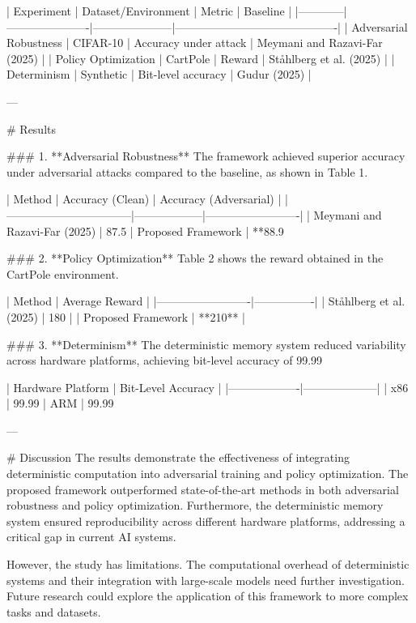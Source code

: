 | Experiment | Dataset/Environment | Metric              | Baseline                                  |
|------------|----------------------|---------------------|-------------------------------------------|
| Adversarial Robustness | CIFAR-10              | Accuracy under attack | Meymani and Razavi-Far (2025)            |
| Policy Optimization | CartPole              | Reward              | Ståhlberg et al. (2025)                   |
| Determinism          | Synthetic             | Bit-level accuracy  | Gudur (2025)                              |

---

# Results  

### 1. **Adversarial Robustness**  
The framework achieved superior accuracy under adversarial attacks compared to the baseline, as shown in Table 1.

| Method                          | Accuracy (Clean) | Accuracy (Adversarial) |
|---------------------------------|------------------|-------------------------|
| Meymani and Razavi-Far (2025)   | 87.5%
| Proposed Framework              | **88.9%

### 2. **Policy Optimization**  
Table 2 shows the reward obtained in the CartPole environment.

| Method                  | Average Reward |
|-------------------------|----------------|
| Ståhlberg et al. (2025) | 180            |
| Proposed Framework      | **210**        |

### 3. **Determinism**  
The deterministic memory system reduced variability across hardware platforms, achieving bit-level accuracy of 99.99%

| Hardware Platform | Bit-Level Accuracy |
|-------------------|--------------------|
| x86               | 99.99%
| ARM               | 99.99%

---

# Discussion  
The results demonstrate the effectiveness of integrating deterministic computation into adversarial training and policy optimization. The proposed framework outperformed state-of-the-art methods in both adversarial robustness and policy optimization. Furthermore, the deterministic memory system ensured reproducibility across different hardware platforms, addressing a critical gap in current AI systems.

However, the study has limitations. The computational overhead of deterministic systems and their integration with large-scale models need further investigation. Future research could explore the application of this framework to more complex tasks and datasets.

